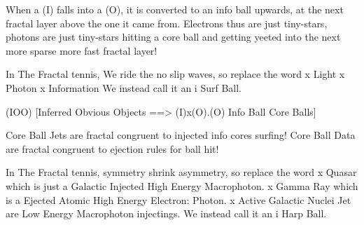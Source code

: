 \documentclass[11pt,a4paper]{article}
\begin{document}
When a (I) falls into a (O), it is converted to an info ball upwards,
at the next fractal layer above the one it came from. Electrons thus
are just tiny-stars, photons are just tiny-stars hitting a core ball
and getting yeeted into the next more sparse more fast fractal layer!

In The Fractal tennis, We ride the no slip waves, so replace the word
 x Light 
 x Photon
 x Information
We instead call it an 
 i Surf Ball. 

(IOO) [Inferred Obvious Objects ==> (I)x(O).(O) Info Ball Core Balls]

 Core Ball Jets are fractal congruent to injected info cores surfing! 
 Core Ball Data are fractal congruent to ejection rules for ball hit!

In The Fractal tennis, symmetry shrink asymmetry, so replace the word   
 x Quasar which is just a Galactic Injected High Energy Macrophoton. 
 x Gamma Ray which is a Ejected Atomic High Energy Electron: Photon. 
 x Active Galactic Nuclei Jet are Low Energy Macrophoton injectings.
We instead call it an 
 i Harp Ball.
\end{document}
